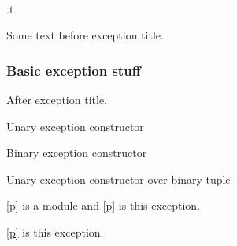 \label{module-Ocamlary-module-Buffer}\begin{ocamlindent}\label{module-Ocamlary-module-Buffer-val-f}\\
\end{ocamlindent}%
\begin{ocamlindent}.t\end{ocamlindent}%
\medbreak
Some text before exception title.

\subsubsection{Basic exception stuff\label{basic-exception-stuff}}%
After exception title.

\label{module-Ocamlary-exception-Kaboom}\begin{ocamlindent}Unary exception constructor\end{ocamlindent}%
\medbreak
\label{module-Ocamlary-exception-Kablam}\begin{ocamlindent}Binary exception constructor\end{ocamlindent}%
\medbreak
\label{module-Ocamlary-exception-Kapow}\begin{ocamlindent}Unary exception constructor over binary tuple\end{ocamlindent}%
\medbreak
\label{module-Ocamlary-exception-EmptySig}\begin{ocamlindent}\hyperref[module-Ocamlary-module-type-EmptySig]{[p\pageref*{module-Ocamlary-module-type-EmptySig}]} is a module and \hyperref[module-Ocamlary-exception-EmptySig]{[p\pageref*{module-Ocamlary-exception-EmptySig}]} is this exception.\end{ocamlindent}%
\medbreak
\label{module-Ocamlary-exception-EmptySigAlias}\begin{ocamlindent}\hyperref[module-Ocamlary-exception-EmptySigAlias]{[p\pageref*{module-Ocamlary-exception-EmptySigAlias}]} is this exception.\end{ocamlindent}%
\medbreak
